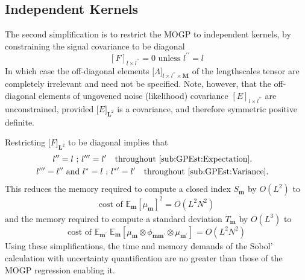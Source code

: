 \documentclass[preprint,12pt]{elsarticle}
\newcommand*{\M}[1]{\ensuremath{#1}\xspace}
\newcommand*{\x}{\times}
\newcommand*{\mi}[1]{\mathbf{#1}}
\newcommand*{\te}[2][]{\left\lbrack{#2}\right\rbrack_{#1}}
\newcommand*{\tte}[2][]{\lbrack{#2}\rbrack_{#1}}
\newcommand{\T}[1]{\text{#1}}
\newcommand*{\QT}[2][]{\M{\quad\T{#2}\ifthenelse{\equal{#1}{}}{\quad}{#1}}}
\newcommand*{\evt}[3][]{\mathbb{E}_{#3}^{#1}\!#2}
\begin{document}
    \subsection{Independent Kernels}\label{sub:Complexity:Indep}
    The second simplification is to restrict the MOGP to independent kernels, by constraining the signal covariance to be diagonal 
    \begin{equation*}
        \te[l\x l^{\prime\prime}]{F} = 0 \T{ unless } l^{\prime\prime} = l
    \end{equation*}
    In which case the off-diagonal elements $\tte[l\x l^{\prime\prime}\x\mi{M}]{\Lambda}$ of the lengthscales tensor are completely irrelevant and need not be specified. Note, however, that the off-diagonal elements of ungovened noise (likelihood) covariance $\te[l\x l^{\prime\prime}]{E}$ are unconstrained, provided $\tte[\mi{L}^{2}]{E}$ is a covariance, and therefore symmetric positive definite.

    Restricting $\tte[\mi{L}^{2}]{F}$ to be diagonal implies that
    \begin{gather*}
        l^{\prime\prime} = l \T{ ; } l^{\prime\prime\prime} = l^{\prime} \QT{throughout \cref{sub:GPEst:Expectation}.}  \\ 
        l^{\prime\prime\prime} = l^{\prime\prime} \T{ and } l^{*} = l \T{ ; } l^{*\prime} = l^{\prime} \QT{throughout \cref{sub:GPEst:Variance}.}
    \end{gather*}
    This reduces the memory required to compute a closed index $S_{\mi{m}}$ by $O(L^2)$ to
    \begin{equation*}
        \T{cost of }\evt{\te[]{\mu_{\mi{m}}}^{2}}{\mi{m}} = O(L^{2}N^{2})
    \end{equation*}
    and the memory required to compute a standard deviation $T_{\mi{m}}$ by $O(L^3)$ to
    \begin{equation*}
        \T{cost of }\evt{\;\evt{\te[]{\mu_{\mi{m}} \otimes \phi_{\mi{mm^{\prime}}} \otimes \mu_{\mi{m^{\prime}}}}}}{\mi{m^{\prime}}}{\mi{m}} = O(L^{2}N^{2})
    \end{equation*}
    Using these simplifications, the time and memory demands of the Sobol' calculation with uncertainty quantification are no greater than those of the MOGP regression enabling it.
\end{document}
